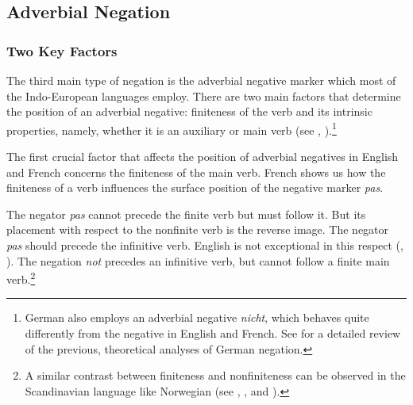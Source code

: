 \documentclass[output=paper]{langsci/langscibook}
\begin{document}
{\subsection{Adverbial Negation}

\subsubsection{Two Key Factors}

The third main type of negation is
the adverbial negative marker which most of the Indo-European
languages employ. There are two main factors
that determine the position of an adverbial negative: finiteness of
the verb and its intrinsic properties, namely, whether it is an auxiliary
or main verb (see \citet{Kim:00}, \citet{KS:02}).\footnote{German also
employs an adverbial negative {\it nicht}, which behaves quite
differently from the negative in English and French. See \citet{MuellerGT-Eng1}
for a detailed review of the previous, theoretical analyses of German negation.}


The first crucial factor that affects  the position of adverbial
negatives in English and French concerns the finiteness of the main verb.
French shows us how the finiteness of a verb influences the
surface position of the negative marker {\it pas}.



\eal{}
\zl


\eal{}
\zl

\noindent
The negator {\it pas} cannot precede the finite verb
but must follow it. But its placement with respect to
the nonfinite verb is the reverse image. The negator {\it pas}
should precede the infinitive verb.
English is not exceptional in this respect (\citet{Baker:89,Baker:91}, \citet{Ernst:92}).
The negation {\it not} precedes an infinitive verb, but cannot follow
a finite main verb.\footnote{A similar contrast between finiteness and
nonfiniteness can be observed in the Scandinavian language like Norwegian (see \citet{Platzack:86}, \citet{HP:88}, and \citet{Vikner:94,Vikner:97}).}

}
\end{document}
